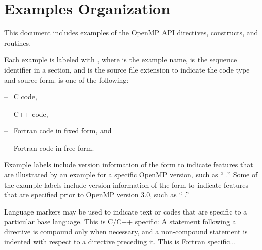 \section{Examples Organization}
\label{chap:examples}
\label{sec:examples}

This document includes examples of the OpenMP API directives, constructs, and routines.

Each example is labeled with , where  is 
the example name,  is the sequence identifier in a section, and 
 is the source file extension to indicate the code type and 
source form.   is one of the following:
\begin{description}[noitemsep,labelindent=5mm,widest=f90]
\item[\plc{c}] -- \ C code,
\item[\plc{cpp}] -- \ C++ code,
\item[\plc{f}] -- \ Fortran code in fixed form, and
\item[\plc{f90}] -- \ Fortran code in free form.
\end{description}

Example labels include version information of the form
 to indicate features that are illustrated
by an example for a specific OpenMP version, such as 
`` \;.''
Some of the example labels include version information of the form
 to indicate features that are specified 
prior to OpenMP version 3.0, such as
`` \;.''

Language markers may be used to indicate text or codes that are specific 
to a particular base language.
\ccppspecificstart
This is C/C++ specific: 
A statement following a directive is compound only when necessary, and a 
non-compound statement is indented with respect to a directive preceding it.
\ccppspecificend
\fortranspecificstart
This is Fortran specific...
\fortranspecificend
